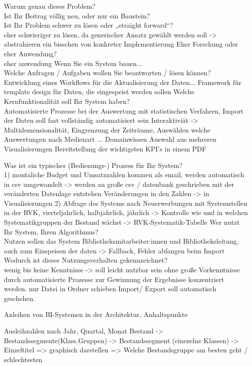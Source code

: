 Warum genau dieses Problem?\\
Ist Ihr Beitrag völlig neu, oder nur ein Baustein?\\
Ist Ihr Problem schwer zu lösen oder „straight forward“?\\
eher schwieriger zu lösen, da generischer Ansatz gewählt werden soll -> abstrahieren ein bisschen von konkreter Implementierung
Eher Forschung oder eher Anwendung?\\
eher anwendung
Wenn Sie ein System bauen...\\
Welche Anfragen / Aufgaben wollen Sie beantworten / lösen können?\\
Entwicklung eines Workflows für die Aktualisierung der Daten...
Framework für template design für Daten, die eingespeist werden sollen
Welche Kernfunktionalität soll Ihr System haben?\\
Automatisierte Prozesse bei der Auswertung mit statistischen Verfahren, Import der Daten soll fast vollständig automatisiert sein
Interaktiviät -> Multidemensionalität, Eingrenzung der Zeiträume, Auswählen welche Auswertungen nach Medienart ... Domainwissen
Auswahl aus mehreren Visualisierungen
Bereitstellung der wichtigsten KPI's in einem PDF

Was ist ein typischer (Bedienungs-) Prozess für Ihr System?\\
1) montaliche Budget und Umsatzzahlen kommen als email, werden automatisch in csv umgewandelt -> werden an große csv / datenbank geschrieben
mit der veränderten Datenlage entstehen Veränderungen in den Zahlen -> in Visualisierungen
2) Abfrage des Systems nach Neuerwerbungen mit Systemstellen in der RVK, vierteljahrlich, halbjahrlich, jährlich -> Kontrolle wie und in welchen Systematikgruppen
der Bestand wächst -> RVK-Systematik-Tabelle
Wer nutzt Ihr System, Ihren Algorithmus?\\
Nutzen sollen das System Bibliotheksmitarbeiter:innen und Bibliotheksleitung, auch zum Einspeisen der daten -> Fallback, Fehler abfangen beim Import
Wodurch ist dieses Nutzungsverhalten gekennzeichnet?\\
wenig bis keine Kenntnisse -> soll leicht nutzbar sein ohne große Vorkenntnisse durch automatisierte Prozesse zur Gewinnung der Ergebnisse konzentriert werden.
nur Datei in Ordner schieben
Import/ Export  soll automatisch geschehen.

Anleihen von BI-Systemen in der Architektur, Anhaltspunkte 

Ausleihzahlen nach Jahr, Quartal, Monat
Bestand -> Bestandssegmente(Klass.Gruppen) -> Bestandssegment (einezelne Klassen) -> Einzeltitel => graphisch darstellen
=> Welche Bestandsgruppe am besten geht / schlechtesten

